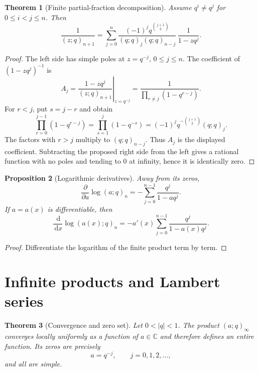 \documentclass[11pt,oneside,openany]{book}
\newtheorem{theorem}{Theorem}[chapter]
\newtheorem{proposition}[theorem]{Proposition}
\theoremstyle{definition}
\theoremstyle{remark}
\newcommand{\C}{\mathbb C}
\newcommand{\dd}{\,\mathrm d}
\newcommand{\abs}[1]{\lvert #1\rvert}
\begin{document}
\begin{theorem}[Finite partial-fraction decomposition]\label{thm:partial-fraction}
Assume $q^i\ne q^j$ for $0\le i<j\le n$.  Then
\[
 \frac{1}{(z;q)_{n+1}}
 =\sum_{j=0}^{n}
 \frac{(-1)^j q^{\binom{j+1}{2}}}
 {(q;q)_j(q;q)_{n-j}}\,
 \frac{1}{1-zq^j}.
\]
\end{theorem}

\begin{proof}
The left side has simple poles at $z=q^{-j}$, $0\le j\le n$.  The coefficient of $(1-zq^j)^{-1}$ is
\[
 A_j=\left.\frac{1-zq^j}{(z;q)_{n+1}}\right|_{z=q^{-j}}
 =\frac{1}{\prod_{r\ne j}(1-q^{r-j})}.
\]
For $r<j$, put $s=j-r$ and obtain
\[
 \prod_{r=0}^{j-1}(1-q^{r-j})
 =\prod_{s=1}^{j}(1-q^{-s})
 =(-1)^jq^{-\binom{j+1}{2}}(q;q)_j.
\]
The factors with $r>j$ multiply to $(q;q)_{n-j}$.  Thus $A_j$ is the displayed coefficient.  Subtracting the proposed right side from the left gives a rational function with no poles and tending to $0$ at infinity, hence it is identically zero.
\end{proof}

\begin{proposition}[Logarithmic derivatives]\label{prop:logder-finite}
Away from its zeros,
\[
 \frac{\partial}{\partial a}\log(a;q)_n
 =-\sum_{j=0}^{n-1}\frac{q^j}{1-aq^j}.
\]
If $a=a(x)$ is differentiable, then
\[
 \frac{\dd}{\dd x}\log(a(x);q)_n
 =-a'(x)\sum_{j=0}^{n-1}\frac{q^j}{1-a(x)q^j}.
\]
\end{proposition}

\begin{proof}
Differentiate the logarithm of the finite product term by term.
\end{proof}

\section{Infinite products and Lambert series}

\begin{theorem}[Convergence and zero set]\label{thm:poch-entire}
Let $0<\abs q<1$.  The product $(a;q)_\infty$ converges locally uniformly as a function of $a\in\C$ and therefore defines an entire function.  Its zeros are precisely
\[
 a=q^{-j},\qquad j=0,1,2,\ldots,
\]
and all are simple.
\end{theorem}
\end{document}
